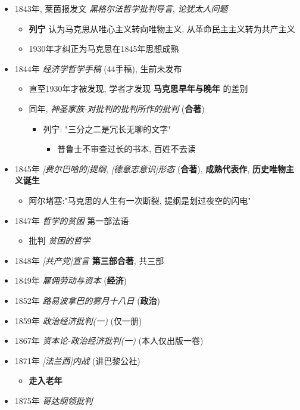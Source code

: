 \documentclass[11pt]{article}
\begin{document}
\begin{itemize}
\item 1843年, 莱茵报发文 \emph{黑格尔法哲学批判导言}, \emph{论犹太人问题}
\begin{itemize}
\item \textbf{列宁} 认为马克思从唯心主义转向唯物主义, 从革命民主主义转为共产主义
\item 1930年才纠正为马克思在1845年思想成熟
\end{itemize}
\item 1844年 \emph{经济学哲学手稿} (44手稿), 生前未发布
\begin{itemize}
\item 直至1930年才被发现, 学者才发现 \textbf{马克思早年与晚年} 的差别
\item 同年, \emph{神圣家族-对批判的批判所作的批判} (\textbf{合著})
\begin{itemize}
\item 列宁: "三分之二是冗长无聊的文字"
\begin{itemize}
\item 普鲁士不审查过长的书本, 百姓不去读
\end{itemize}
\end{itemize}
\end{itemize}
\item 1845年 \emph{[费尔巴哈的]提纲}, \emph{[德意志意识]形态} (\textbf{合著}), \textbf{成熟代表作}, \textbf{历史唯物主义诞生}
\begin{itemize}
\item 阿尔堵塞:"马克思的人生有一次断裂, 提纲是划过夜空的闪电"
\end{itemize}
\item 1847年 \emph{哲学的贫困} 第一部法语
\begin{itemize}
\item 批判 \emph{贫困的哲学}
\end{itemize}
\item 1848年 \emph{[共产党]宣言} \textbf{第三部合著}, 共三部
\item 1849年 \emph{雇佣劳动与资本} (\textbf{经济})
\item 1852年 \emph{路易波拿巴的雾月十八日} (\textbf{政治})
\item 1859年 \emph{政治经济批判(一)} (仅一册)
\item 1867年 \emph{资本论-政治经济批判(一)} (本人仅出版一卷)
\item 1871年 \emph{[法兰西]内战} (讲巴黎公社) 
\begin{itemize}
\item \textbf{走入老年}
\end{itemize}
\item 1875年 \emph{哥达纲领批判}
\end{itemize}
\end{document}
